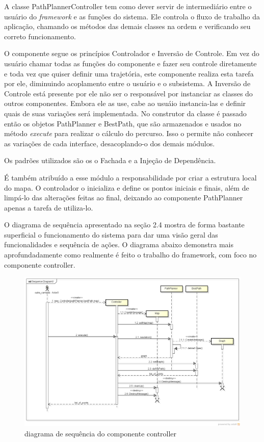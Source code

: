 A classe PathPlannerController tem como dever servir de intermediário entre o usuário do \textit{framework} e as funções do sistema. Ele controla o fluxo de trabalho da aplicação, chamando os métodos das demais classes na ordem e verificando seu correto funcionamento.

O componente segue os princípios Controlador e Inversão de Controle. Em vez do usuário chamar todas as funções do componente e fazer seu controle diretamente e toda vez que quiser definir uma trajetória, este componente realiza esta tarefa por ele, diminuindo acoplamento entre o usuário e o subsistema. A Inversão de Controle está presente por ele não ser o responsável por instanciar as classes do outros componentes. Embora ele as use, cabe ao usuáio instancia-las e definir quais de suas variações será implementada. No construtor da classe é passado então os objetos PathPlanner e BestPath, que são armazenados e usados no método \textit{execute} para realizar o cálculo do percurso. Isso o permite não conhecer as variações de cada interface, desacoplando-o dos demais módulos.

Os padrões utilizados são os o Fachada e a Injeção de Dependência.

É também atribuído a esse módulo a responsabilidade por criar a estrutura local do mapa. O controlador o inicializa e define os pontos iniciais e finais, além de limpá-lo das alterações feitas ao final, deixando ao componente PathPlanner apenas a tarefa de utiliza-lo.

O diagrama de sequência apresentado na seção 2.4 mostra de forma bastante superficial o funcionamento do sistema para dar uma visão geral das funcionalidades e sequência de ações. O diagrama abaixo demonstra mais aprofundadamente como realmente é feito o trabalho do framework, com foco no componente controller.

\begin{figure}[h]
	\centering
	\label{fig22}
		\includegraphics[keepaspectratio=true,scale=0.4]{figuras/executeController.png}
	\caption{diagrama de sequência do componente controller}
\end{figure}

